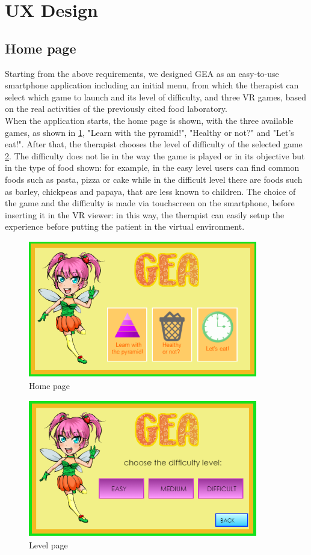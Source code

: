 \section{UX Design}
\subsection{Home page}
Starting from the above requirements, we designed GEA as an easy-to-use smartphone application including an initial menu, from which the therapist can select which game to launch and its level of difficulty, and three VR games, based on the real activities of the previously cited food laboratory.\\
When the application starts, the home page is shown, with the three available games, as shown in \ref{fig:home}, "Learn with the pyramid!", "Healthy or not?" and "Let's eat!". After that, the therapist chooses the level of difficulty of the selected game \ref{fig:level}. The difficulty does not lie in the way the game is played or in its objective but in the type of food shown: for example, in the easy level users can find common foods such as pasta, pizza or cake while in the difficult level there are foods such as barley, chickpeas and papaya, that are less known to children. The choice of the game and the difficulty is made via touchscreen on the smartphone, before inserting it in the VR viewer: in this way, the therapist can easily setup the experience before putting the patient in the virtual environment.
\begin{figure}[H]
\centering
\includegraphics[width=10cm, height=6cm]{immagini/Game.png}
\caption{Home page}\label{fig:home}
\end{figure}
\begin{figure}[H]
\centering
\includegraphics[width=10cm, height=6cm]{immagini/Level.png}
\caption{Level page}\label{fig:level}
\end{figure}
